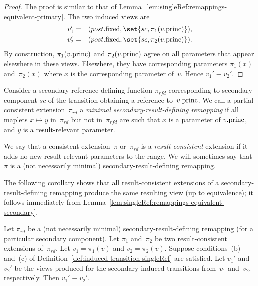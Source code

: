 \begin{proof}
The proof is similar to that of
Lemma~\ref{lem:singleRef:remappings-equivalent-primary}.  The two induced
views are
\begin{eqnarray*}
v_1' & = & (post.\fixed, \set{sc, \pi_1(v.\princ)}), \\
v_2' & = & (post.\fixed, \set{sc, \pi_2(v.\princ)}).
\end{eqnarray*}
%
By construction, $\pi_1(v.\mathrm{princ})$ and $\pi_2(v.\mathrm{princ})$ agree on all
parameters that appear elsewhere in these views.  Elsewhere, they have
corresponding parameters $\pi_1(x)$ and~$\pi_2(x)$ where $x$ is the
corresponding parameter of~$v$.  Hence $v_1' \equiv v_2'$.
\end{proof}


\begin{definition}
Consider a secondary-reference-defining function $\pi_{rfd}$ corresponding to
secondary component $sc$ of the transition obtaining a reference
to~$v.\mathrm{princ}$.  We call a partial consistent extension~$\pi_{rd}$ a
\emph{minimal secondary-result-defining remapping} if all maplets $x \mapsto y$
in~$\pi_{rd}$ but not in~$\pi_{rfd}$ are such that $x$ is a parameter of
$v.\mathrm{princ}$, and $y$ is a result-relevant parameter.

We say that a consistent extension~$\pi$ or~$\pi_{rd}$ is a
\emph{result-consistent} extension if it adds no new result-relevant
parameters to the range.  We will sometimes say that $\pi$ is a (not
necessarily minimal) secondary-result-defining remapping.
\end{definition}


The following corollary shows that all result-consistent extensions of a
secondary-result-defining remapping produce the same resulting view (up to
equivalence); it follows immediately from
Lemma~\ref{lem:singleRef:remappings-equivalent-secondary}.
%
\begin{corollary}
Let $\pi_{rd}$ be a (not necessarily minimal) secondary-result-defining
remapping (for a particular secondary component).  Let $\pi_1$ and~$\pi_2$ be
two result-consistent extensions of~$\pi_{rd}$.  Let $v_1 = \pi_1(v)$ and $v_2
= \pi_2(v)$.  Suppose conditions~(b) and~(c) of
Definition~\ref{def:induced-transition-singleRef} are satisfied.  Let $v_1'$
and $v_2'$ be the views produced for the secondary induced transitions
from~$v_1$ and~$v_2$, respectively.  Then $v_1' \equiv v_2'$.
\end{corollary}
